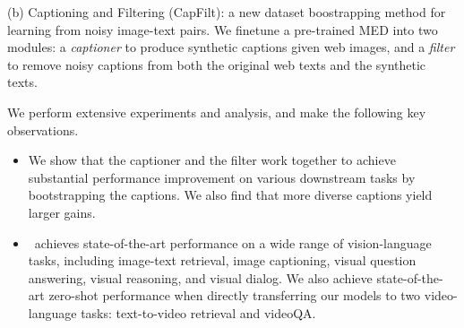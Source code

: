 (b) Captioning and Filtering (CapFilt):
a new dataset boostrapping method for learning from noisy image-text pairs.
We finetune a pre-trained MED into two modules: a \textit{captioner} to produce synthetic captions given web images,
and a \textit{filter} to remove noisy captions from both the original web texts and the synthetic texts.



We perform extensive experiments and analysis, and make the following key observations. 
\vspace{-\topsep}
\vspace{-1ex}
\begin{itemize}[leftmargin=*]
	\setlength\itemsep{0pt}
	\item We show that the captioner and the filter work together to achieve substantial performance improvement on various downstream tasks by bootstrapping the captions.  
	We also find that more diverse captions yield larger gains.
	\item \name~achieves state-of-the-art performance on a wide range of vision-language tasks,
	including image-text retrieval, image captioning, visual question answering, visual reasoning, and visual dialog. We also achieve state-of-the-art zero-shot performance when directly transferring our models to two video-language tasks: text-to-video retrieval and videoQA.
\end{itemize}